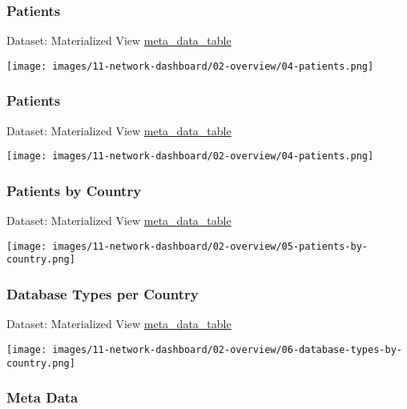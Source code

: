 \documentclass[
]{book}
\begin{document}
\hypertarget{patients}{%
\subsubsection*{Patients}\label{patients}}

Dataset: Materialized View \href{materialized-views-1.html\#meta_data_table}{meta\_data\_table}

\texttt{[image: images/11-network-dashboard/02-overview/04-patients.png]}

\hypertarget{patients-1}{%
\subsubsection*{Patients}\label{patients-1}}

Dataset: Materialized View \href{materialized-views-1.html\#meta_data_table}{meta\_data\_table}

\texttt{[image: images/11-network-dashboard/02-overview/04-patients.png]}

\hypertarget{patients-by-country}{%
\subsubsection*{Patients by Country}\label{patients-by-country}}

Dataset: Materialized View \href{materialized-views-1.html\#patients_per_country_and_database_type}{meta\_data\_table}

\texttt{[image: images/11-network-dashboard/02-overview/05-patients-by-country.png]}

\hypertarget{database-types-per-country}{%
\subsubsection*{Database Types per Country}\label{database-types-per-country}}

Dataset: Materialized View \href{materialized-views-1.html\#patients_per_country_and_database_type}{meta\_data\_table}

\texttt{[image: images/11-network-dashboard/02-overview/06-database-types-by-country.png]}

\hypertarget{meta-data}{%
\subsubsection*{Meta Data}\label{meta-data}}
\end{document}
